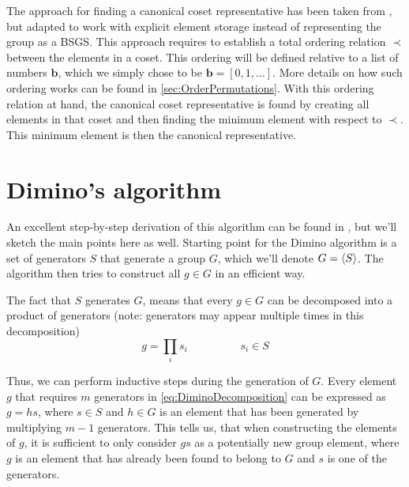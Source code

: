 \documentclass[parskip=half]{scrartcl}
\begin{document}
	The approach for finding a canonical coset representative has been taken from \textcite{Manssur2002a}, but adapted to work with explicit element
	storage instead of representing the group as a BSGS. This approach requires to establish a total ordering relation $\prec$ between the elements in
	a coset.\supercite{Manssur2002a} This ordering will be defined relative to a list of numbers $\mathbf{b}$, which we simply chose to be
	$\mathbf{b} = [ 0, 1, \ldots ]$. More details on how such ordering works can be found in \cref{sec:OrderPermutations}. With this ordering
	relation at hand, the canonical coset representative is found by creating all elements in that coset and then finding the minimum element with
	respect to $\prec$. This minimum element is then the canonical representative.

	\appendix

	\section{Dimino's algorithm}
	\label{sec:DiminoAlgorithm}

	An excellent step-by-step derivation of this algorithm can be found in \textcite{Butler1991a}, but we'll sketch the main points here as well.
	Starting point for the Dimino algorithm is a set of generators $S$ that generate a group $G$, which we'll denote $G = \braket{S}$. The algorithm
	then tries to construct all $g \in G$ in an efficient way.

	The fact that $S$ generates $G$, means that every $g \in G$ can be decomposed into a product of generators (note: generators may appear multiple
	times in this decomposition)
	\begin{equation}
		\label{eq:DiminoDecomposition}
		g = \prod_i s_i \hspace{2cm} s_i \in S
	\end{equation}

	Thus, we can perform inductive steps during the generation of $G$.\supercite{Butler1991a} Every element $g$ that requires $m$ generators in
	\cref{eq:DiminoDecomposition} can be expressed as $g = h s$, where $s \in S$ and $h \in G$ is an element that has been generated by multiplying
	$m-1$ generators.\supercite{Butler1991a} This tells us, that when constructing the elements of $g$, it is sufficient to only consider $gs$ as a
	potentially new group element, where $g$ is an element that has already been found to belong to $G$ and $s$ is one of the
	generators.\supercite{Butler1991a}
\end{document}
